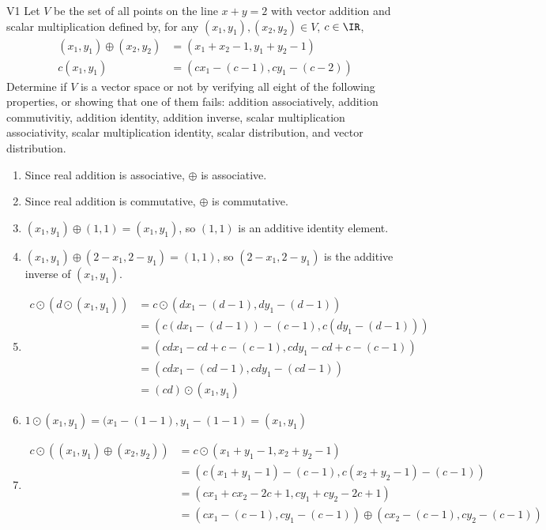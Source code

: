 \begin{problem}{V1}
Let $V$ be the set of all points on the line $x+y=2$ with vector addition
and scalar multiplication defined by, for any $(x_1,y_1), (x_2,y_2) \in V$, $c \in \IR$,
\begin{align*}
(x_1,y_1) \oplus (x_2,y_2) &= (x_1+x_2-1,y_1+y_2-1) \\
c (x_1,y_1) &= (cx_1-(c-1), cy_1-(c-2))
\end{align*}
Determine if $V$ is a vector space or not by verifying all eight of the
following properties, or showing that one of them fails: addition associatively,
addition commutivitiy, addition identity, addition inverse,
scalar multiplication associativity, scalar multiplication identity,
scalar distribution, and vector distribution.
\end{problem}
\begin{solution}
\begin{enumerate}[1)]
\item Since real addition is associative, $\oplus$ is associative.
\item Since real addition is commutative, $\oplus$ is commutative.
\item $(x_1,y_1) \oplus (1,1) = (x_1,y_1)$, so $(1,1)$ is an additive identity element.
\item $(x_1,y_1) \oplus (2-x_1,2-y_1) = (1,1)$, so $(2-x_1,2-y_1)$ is the additive inverse of $(x_1,y_1)$.
\item \begin{align*} c\odot \left(d \odot (x_1,y_1) \right) &=c\odot \left( dx_1-(d-1),dy_1-(d-1)\right) \\
&= \left( c\left(dx_1-(d-1) \right)-(c-1), c\left(dy_1-(d-1) \right) \right) \\
&= \left(cdx_1-cd+c-(c-1), cdy_1-cd+c-(c-1) \right) \\
&= \left(cdx_1-(cd-1), cdy_1-(cd-1) \right) \\
&= (cd) \odot (x_1,y_1)
\end{align*}
\item $1 \odot (x_1,y_1) = (x_1-(1-1),y_1-(1-1)=(x_1,y_1)$
\item \begin{align*} c \odot \left( (x_1,y_1)\oplus(x_2,y_2) \right) &=
c\odot \left( x_1+y_1-1,x_2+y_2-1 \right) \\
&= \left( c(x_1+y_1-1)-(c-1), c(x_2+y_2-1)-(c-1) \right) \\
&= (cx_1+cx_2-2c+1, cy_1+cy_2-2c+1) \\
&= \left(cx_1-(c-1),cy_1-(c-1) \right) \oplus (cx_2-(c-1),cy_2-(c-1)) \\

\end{align*}
\end{enumerate}
\end{solution}
